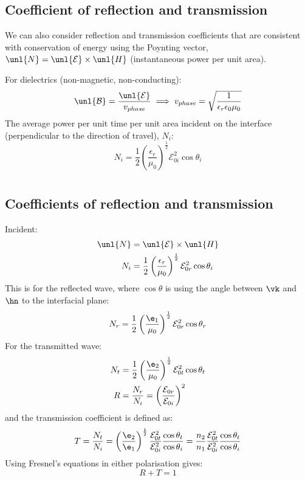 \documentclass[a4paper, 11pt, normalem]{report}
\renewcommand\E{\mathcal{E}}
\newcommand\uE{\unl{\E}}
\renewcommand\B{\mathcal{B}}
\newcommand\uB{\unl{\B}}
\newcommand\eno{\epsilon_0}
\newcommand\er{\epsilon_r}
\begin{document}
\section{Coefficient of reflection and transmission}
We can also consider reflection and transmission coefficients that are consistent with conservation of energy using the Poynting vector, $\unl{N} = \uE \times \unl{H}$ (instantaneous power per unit area).

For dielectrics (non-magnetic, non-conducting):
\begin{equation}
	\uB = \frac{\uE}{v_{phase}} \implies v_{phase} = \sqrt{\frac{1}{\er\eno\mu_0}}
\end{equation}
The average power per unit time per unit area incident on the interface (perpendicular to the direction of travel), $N_i$:
\begin{equation}
	N_i = \frac{1}{2}\left(\frac{\er}{\mu_0}\right)^{\frac{1}{2}} \E_{0i}^2\cos\theta_i
\end{equation}

\chapter{}
\section{Coefficients of reflection and transmission}
Incident:
\begin{align}
	\unl{N} &= \uE \times \unl{H} \\
	N_i &= \frac{1}{2}\left(\frac{\er}{\mu_0}\right)^{\frac{1}{2}} \E_{0r}^2\cos\theta_i
\end{align}
This is for the reflected wave, where $\cos\theta$ is using the angle between $\vk$ and $\hn$ to the interfacial plane:
\begin{equation}
	N_r = \frac{1}{2}\left(\frac{\e_1}{\mu_0}\right)^{\frac{1}{2}} \E_{0r}^2\cos\theta_r
\end{equation}
For the transmitted wave:
\begin{align}
	N_t &= \frac{1}{2}\left(\frac{\e_2}{\mu_0}\right)^{\frac{1}{2}} \E_{0t}^2\cos\theta_t \\
	R &= \frac{N_r}{N_i} = \left(\frac{\E_{0r}}{\E_{0i}}\right)^2
\end{align}
and the transmission coefficient is defined as:
\begin{equation}
	T = \frac{N_t}{N_i} = \left(\frac{\e_2}{\e_1}\right)^{\frac{1}{2}}\frac{\E_{0t}^2}{\E_{0i}^2} \frac{\cos\theta_t}{\cos\theta_i} = \frac{n_2}{n_1}\frac{\E_{0t}^2}{\E_{0i}^2} \frac{\cos\theta_t}{\cos\theta_i}
\end{equation}
Using Fresnel's equations in either polarisation gives:
\begin{equation}
	R + T = 1
\end{equation}
\end{document}
